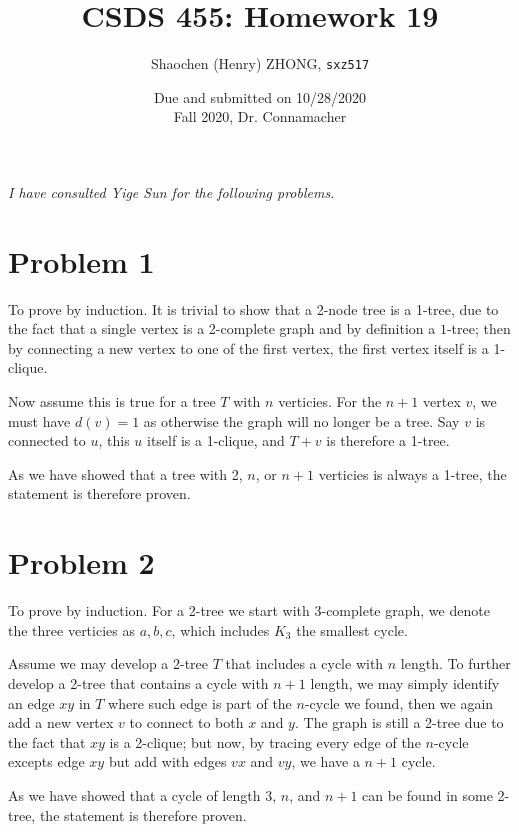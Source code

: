 \documentclass[11pt]{article}
\newcommand{\ilc}{\texttt}
\begin{document}
\title{\textbf{CSDS 455: Homework 19}}

\author{Shaochen (Henry) ZHONG, \ilc{sxz517}}
\date{Due and submitted on 10/28/2020 \\ Fall 2020, Dr. Connamacher}
\maketitle

\textit{I have consulted Yige Sun for the following problems.}

\section*{Problem 1}

To prove by induction. It is trivial to show that a 2-node tree is a 1-tree, due to the fact that a single vertex is a 2-complete graph and by definition a $1$-tree; then by connecting a new vertex to one of the first vertex, the first vertex itself is a 1-clique.

Now assume this is true for a tree $T$ with $n$ verticies. For the $n+1$ vertex $v$, we must have $d(v) = 1$ as otherwise the graph will no longer be a tree. Say $v$ is connected to $u$, this $u$ itself is a 1-clique, and $T + v$ is therefore a 1-tree.\newline

As we have showed that a tree with 2, $n$, or $n+1$ verticies is always a 1-tree, the statement is therefore proven.

\section*{Problem 2}

To prove by induction. For a 2-tree we start with 3-complete graph, we denote the three verticies as $a, b, c$, which includes $K_3$ the smallest cycle.

Assume we may develop a 2-tree $T$ that includes a cycle with $n$ length. To further develop a 2-tree that contains a cycle with $n+1$ length, we may simply identify an edge $xy$ in $T$ where such edge is part of the $n$-cycle we found, then we again add a new vertex $v$ to connect to both $x$ and $y$. The graph is still a 2-tree due to the fact that $xy$ is a 2-clique; but now, by tracing every edge of the $n$-cycle excepts edge $xy$ but add with edges $vx$ and $vy$, we have a $n+1$ cycle.\newline

As we have showed that a cycle of length 3, $n$, and $n+1$ can be found in some 2-tree, the statement is therefore proven.
\end{document}
